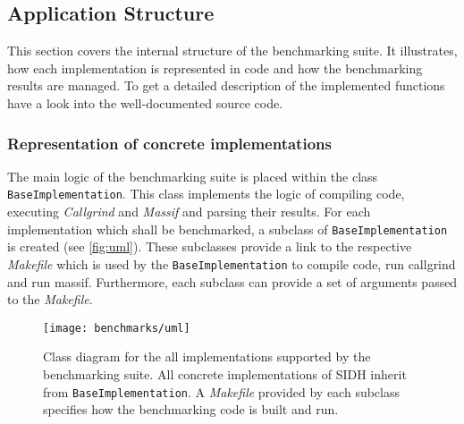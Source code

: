 \subsection{Application Structure}\label{sec:app_structure}

This section covers the internal structure of the benchmarking suite. It illustrates, how each implementation is represented in code and how the benchmarking results are managed. To get a detailed description of the implemented functions have a look into the well-documented source code.

\subsubsection{Representation of concrete implementations}

The main logic of the benchmarking suite is placed within the class \texttt{BaseImplementation}. This class implements the logic of compiling code, executing \textit{Callgrind} and \textit{Massif} and parsing their results. For each implementation which shall be benchmarked, a subclass of \texttt{BaseImplementation} is created (see \autoref{fig:uml}). These subclasses provide a link to the respective \textit{Makefile} which is used by the \texttt{BaseImplementation} to compile code, run callgrind and run massif. Furthermore, each subclass can provide a set of arguments passed to the \textit{Makefile}.\\

\begin{figure}[H]
  \centering
  \texttt{[image: benchmarks/uml]}
  \caption[Class diagram for supported implementations]
  {Class diagram for the all implementations supported by the benchmarking suite. All concrete implementations of SIDH inherit from \texttt{BaseImplementation}. A \textit{Makefile} provided by each subclass specifies how the benchmarking code is built and run.} \label{fig:uml}
\end{figure}

